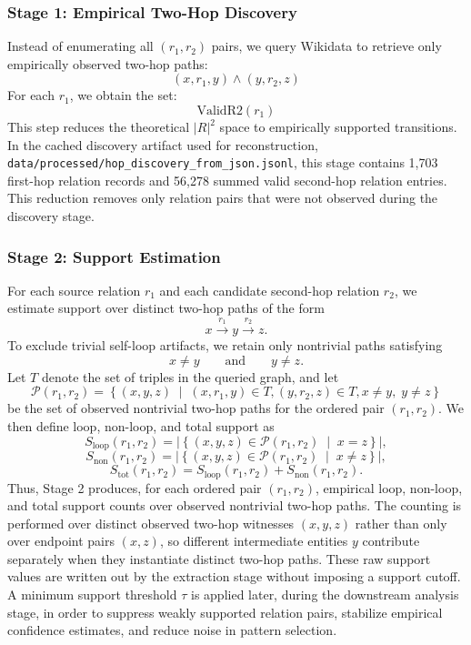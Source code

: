 \documentclass[12pt,a4paper]{article}
\begin{document}
\subsubsection{Stage 1: Empirical Two-Hop Discovery}

Instead of enumerating all $(r_1, r_2)$ pairs, we query Wikidata to retrieve only empirically observed two-hop paths:
\[
(x, r_1, y) \wedge (y, r_2, z)
\]
For each $r_1$, we obtain the set:
\[
\mathrm{ValidR2}(r_1)
\]
This step reduces the theoretical $|R|^2$ space to empirically supported transitions. In the cached discovery artifact used for reconstruction, \texttt{data/processed/hop\_discovery\_from\_json.jsonl}, this stage contains 1,703 first-hop relation records and 56,278 summed valid second-hop relation entries.
This reduction removes only relation pairs that were not observed during the discovery stage.

\subsubsection{Stage 2: Support Estimation}

For each source relation $r_1$ and each candidate second-hop relation $r_2$, we estimate support over distinct two-hop paths of the form
\[
x \xrightarrow{r_1} y \xrightarrow{r_2} z.
\]
To exclude trivial self-loop artifacts, we retain only nontrivial paths satisfying
\[
x \neq y
\qquad\text{and}\qquad
y \neq z.
\]
Let $T$ denote the set of triples in the queried graph, and let
\[
\mathcal{P}(r_1,r_2)
=
\left\{
(x,y,z)\;\middle|\;
(x,r_1,y)\in T, %
(y,r_2,z)\in T, %
x \neq y,\; y \neq z
\right\}
\]
be the set of observed nontrivial two-hop paths for the ordered pair $(r_1,r_2)$. We then define loop, non-loop, and total support as
\[
S_{\mathrm{loop}}(r_1,r_2)
=
\left|
\left\{
(x,y,z)\in \mathcal{P}(r_1,r_2)
\;\middle|\;
x=z
\right\}
\right|,
\]
\[
S_{\mathrm{non}}(r_1,r_2)
=
\left|
\left\{
(x,y,z)\in \mathcal{P}(r_1,r_2)
\;\middle|\;
x\neq z
\right\}
\right|,
\]
\[
S_{\mathrm{tot}}(r_1,r_2)
=
S_{\mathrm{loop}}(r_1,r_2)
+
S_{\mathrm{non}}(r_1,r_2).
\]
Thus, Stage 2 produces, for each ordered pair $(r_1,r_2)$, empirical loop, non-loop, and total support counts over observed nontrivial two-hop paths. The counting is performed over distinct observed two-hop witnesses $(x,y,z)$ rather than only over endpoint pairs $(x,z)$, so different intermediate entities $y$ contribute separately when they instantiate distinct two-hop paths. 
These raw support values are written out by the extraction stage without imposing a support cutoff. A minimum support threshold $\tau$ is applied later, during the downstream analysis stage, in order to suppress weakly supported relation pairs, stabilize empirical confidence estimates, and reduce noise in pattern selection.
\end{document}
